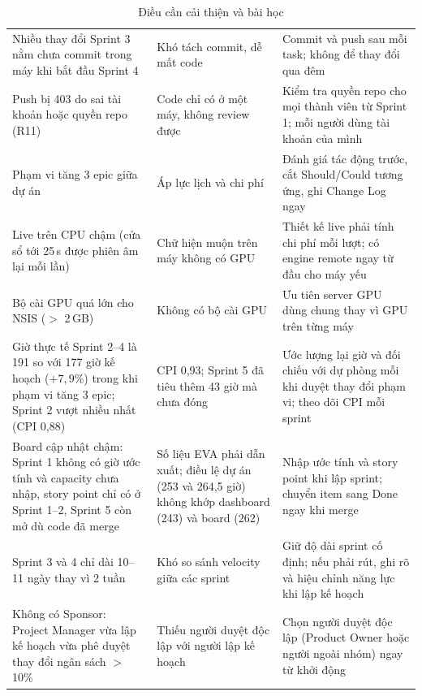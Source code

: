 \documentclass[12pt,a4paper]{report}
\begin{document}
\begin{table}[htbp]
  \centering
  \caption{Điều cần cải thiện và bài học}
  \label{tab:improve}
  \small
  \begin{tabularx}{\linewidth}{@{}P{4.4cm}P{3.6cm}L@{}}
    \toprule
     &  &  \\
    \midrule
    Nhiều thay đổi Sprint 3 nằm chưa commit trong máy khi bắt đầu Sprint 4 & Khó tách commit, dễ mất code
      & Commit và push sau mỗi task; không để thay đổi qua đêm \\
    Push bị 403 do sai tài khoản hoặc quyền repo (R11) & Code chỉ có ở một máy, không review được
      & Kiểm tra quyền repo cho mọi thành viên từ Sprint 1; mỗi người dùng tài khoản của mình \\
    Phạm vi tăng 3 epic giữa dự án & Áp lực lịch và chi phí
      & Đánh giá tác động trước, cắt Should/Could tương ứng, ghi Change Log ngay \\
    Live trên CPU chậm (cửa sổ tới 25\,s được phiên âm lại mỗi lần) & Chữ hiện muộn trên máy không có GPU
      & Thiết kế live phải tính chi phí mỗi lượt; có engine remote ngay từ đầu cho máy yếu \\
    Bộ cài GPU quá lớn cho NSIS ($>$ 2\,GB) & Không có bộ cài GPU
      & Ưu tiên server GPU dùng chung thay vì GPU trên từng máy \\
    Giờ thực tế Sprint 2--4 là 191 so với 177 giờ kế hoạch ($+7{,}9\%$) trong khi phạm vi tăng 3 epic; Sprint 2 vượt nhiều nhất (CPI 0,88) & CPI 0,93;
      Sprint 5 đã tiêu thêm 43 giờ mà chưa đóng
      & Ước lượng lại giờ và đối chiếu với dự phòng mỗi khi duyệt thay đổi phạm vi; theo dõi CPI mỗi sprint \\
    Board cập nhật chậm: Sprint 1 không có giờ ước tính và capacity chưa nhập, story point chỉ có ở Sprint 1--2, Sprint 5 còn mở dù code đã
      merge & Số liệu EVA phải dẫn xuất; điều lệ dự án (253 và 264,5 giờ) không khớp dashboard (243) và board (262)
      & Nhập ước tính và story point khi lập sprint; chuyển item sang Done ngay khi merge \\
    Sprint 3 và 4 chỉ dài 10--11 ngày thay vì 2 tuần & Khó so sánh velocity giữa các sprint
      & Giữ độ dài sprint cố định; nếu phải rút, ghi rõ và hiệu chỉnh năng lực khi lập kế hoạch \\
    Không có Sponsor: Project Manager vừa lập kế hoạch vừa phê duyệt thay đổi ngân sách $>$ 10\% & Thiếu người duyệt
      độc lập với người lập kế hoạch
      & Chọn người duyệt độc lập (Product Owner hoặc người ngoài nhóm) ngay từ khởi động \\
    \bottomrule
  \end{tabularx}
\end{table}
\end{document}
